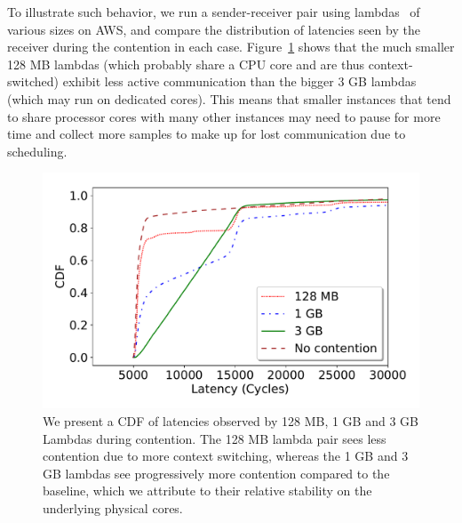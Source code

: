 To illustrate such behavior, we run a sender-receiver pair using
lambdas~\cite{awslambda} of various sizes on AWS, and compare the distribution
of latencies seen by the receiver during the contention in each case.
Figure~\ref{fig:context_switching} shows that the much smaller 128 MB lambdas
(which probably share a CPU core and are thus context-switched) exhibit less
active communication than the bigger 3 GB lambdas (which may run on dedicated
cores). This means that smaller instances that tend to share processor cores
with many other instances may need to pause for more time and collect more
samples to make up for lost communication due to scheduling.


\begin{figure}[!t]
  \includegraphics[width=.99\linewidth]{fig/lambda_sched_effect.pdf}
  \caption{We present a CDF of latencies observed by 128 MB, 1 GB and 3 GB
  Lambdas during contention. The 128 MB lambda pair sees less contention due to
  more context switching, whereas the 1 GB and 3 GB lambdas see progressively
  more contention compared to the baseline, which we attribute to their relative
  stability on the underlying physical cores.
\label{fig:context_switching}}
\end{figure}

